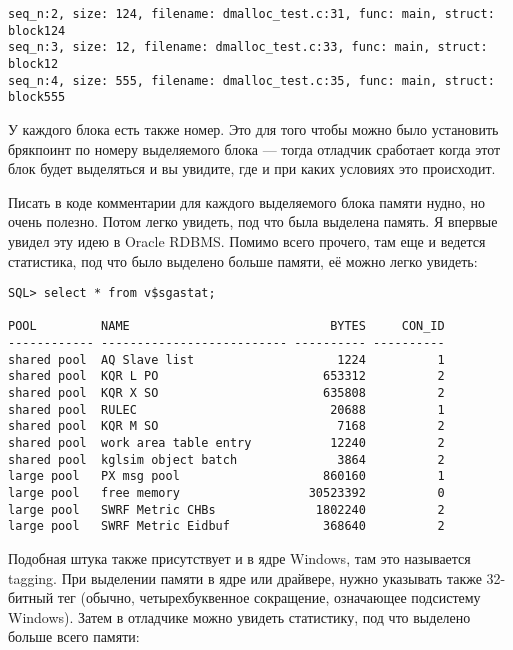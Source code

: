 \begin{lstlisting}
seq_n:2, size: 124, filename: dmalloc_test.c:31, func: main, struct: block124
seq_n:3, size: 12, filename: dmalloc_test.c:33, func: main, struct: block12
seq_n:4, size: 555, filename: dmalloc_test.c:35, func: main, struct: block555
\end{lstlisting}

У каждого блока есть также номер.
Это для того чтобы можно было установить брякпоинт по номеру выделяемого блока --- 
тогда отладчик сработает когда этот блок будет выделяться и вы увидите, где и при каких условиях это происходит.

Писать в коде комментарии для каждого выделяемого блока памяти нудно, но очень полезно. Потом легко увидеть,
под что была выделена память. Я впервые увидел эту идею в Oracle RDBMS. Помимо всего прочего, там еще и ведется
статистика, под что было выделено больше памяти, её можно легко увидеть:

\begin{lstlisting}
SQL> select * from v$sgastat;

POOL         NAME                            BYTES     CON_ID
------------ -------------------------- ---------- ----------
shared pool  AQ Slave list                    1224          1
shared pool  KQR L PO                       653312          2
shared pool  KQR X SO                       635808          2
shared pool  RULEC                           20688          1
shared pool  KQR M SO                         7168          2
shared pool  work area table entry           12240          2
shared pool  kglsim object batch              3864          2
large pool   PX msg pool                    860160          1
large pool   free memory                  30523392          0
large pool   SWRF Metric CHBs              1802240          2
large pool   SWRF Metric Eidbuf             368640          2
\end{lstlisting}

Подобная штука также присутствует и в ядре Windows, там это называется tagging. При выделении памяти
в ядре или драйвере, нужно указывать также 32-битный тег (обычно, четырехбуквенное сокращение, означающее
подсистему Windows). 
Затем в отладчике можно увидеть статистику, под что выделено больше всего памяти:

